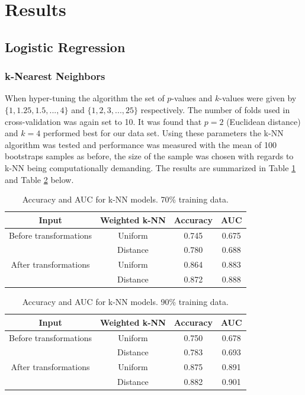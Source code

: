 \documentclass{article}
\begin{document}
\section{Results}

\subsection{Logistic Regression}

\subsubsection{k-Nearest Neighbors}

When hyper-tuning the algorithm the set of $p$-values and $k$-values were given by $\{1,1.25,1.5,...,4\}$ and $\{1,2,3,...,25\}$ respectively. The number of folds used in cross-validation was again set to 10. It was found that $p = 2$ (Euclidean distance) and $k = 4$ performed best for our data set. Using these parameters the k-NN algorithm was tested and performance was measured with the mean of 100 bootstraps samples as before, the size of the sample was chosen with regards to k-NN being computationally demanding. The results are summarized in Table \ref{tab:k_nn_table_10} and Table \ref{tab:k_nn_table_20} below.
 

\begin{table}[!h]
\centering
\begin{tabular}{cccc}
		Input & Weighted k-NN & Accuracy & AUC \\
		\midrule
		Before transformations & Uniform & 0.745 & 0.675 \\
	    & Distance & 0.780 & 0.688 \\
		\midrule
		After transformations & Uniform & 0.864 & 0.883 \\
		& Distance & 0.872 & 0.888 \\
	\end{tabular}
	\caption{Accuracy and AUC for k-NN models. 70\% training data.}
	\label{tab:k_nn_table_10}
\end{table}


\begin{table}[!h]
\centering
\begin{tabular}{cccc}
        Input & Weighted k-NN & Accuracy & AUC \\
		\midrule
		Before transformations & Uniform & 0.750 & 0.678 \\
	    & Distance & 0.783 & 0.693 \\
		\midrule
		After transformations & Uniform & 0.875 & 0.891 \\
		& Distance & 0.882 & 0.901 \\
	\end{tabular}
	\caption{Accuracy and AUC for k-NN models. 90\% training data.}
	\label{tab:k_nn_table_20}
\end{table}
\end{document}
